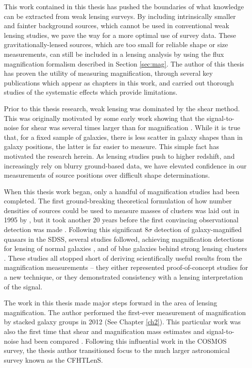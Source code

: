 This work contained in this thesis has pushed the boundaries of what knowledge can be extracted from weak lensing surveys. By including intrinsically smaller and fainter background sources, which cannot be used in conventional weak lensing studies, we pave the way for a more optimal use of survey data. These gravitationally-lensed sources, which are too small for reliable shape or size measurements, can still be included in a lensing analysis by using the flux magnification formalism described in Section \ref{sec:mag}. The author of this thesis has proven the utility of measuring magnification, through several key publications which appear as chapters in this work, and carried out thorough studies of the systematic effects which provide limitations. 

Prior to this thesis research, weak lensing was dominated by the shear method. This was originally motivated by some early work showing that the signal-to-noise for shear was several times larger than for magnification \citep{Schneider00}. While it is true that, for a fixed sample of galaxies, there is less scatter in galaxy shapes than in galaxy positions, the latter is far easier to measure. This simple fact has motivated the research herein. As lensing studies push to higher redshift, and increasingly rely on blurry ground-based data, we have elevated confidence in our measurements of source positions over difficult shape determinations. 

When this thesis work began, only a handful of magnification studies had been completed. The first ground-breaking theoretical formulation of how number densities of sources could be used to measure masses of clusters was laid out in 1995 by \citet{Broadhurst95}, but it took another 20 years before the first convincing observational detection was made \citep{Scranton05}. Following this significant $8\sigma$ detection of galaxy-magnified quasars in the \acf{SDSS}, several studies followed, achieving magnification detections for lensing of normal galaxies \citep{Hildebrandt09b}, and of blue galaxies behind strong lensing clusters \citep{Umetsu11}. These studies all stopped short of deriving scientifically useful results from the magnification measurements -- they either represented proof-of-concept studies for a new technique, or they demonstrated consistency with a lensing interpretation of the signal.

The work in this thesis made major steps forward in the area of lensing magnification. The author performed the first-ever measurement of magnification by stacked galaxy groups in 2012 (See Chapter \ref{ch2}). This particular work was also the first time that shear and magnification mass estimates and signal-to-noise had been compared \citep{Ford12}. Following this influential work in the \acf{COSMOS} survey, the thesis author transitioned focus to the much larger astronomical survey known as the \acf{CFHTLenS}. 

